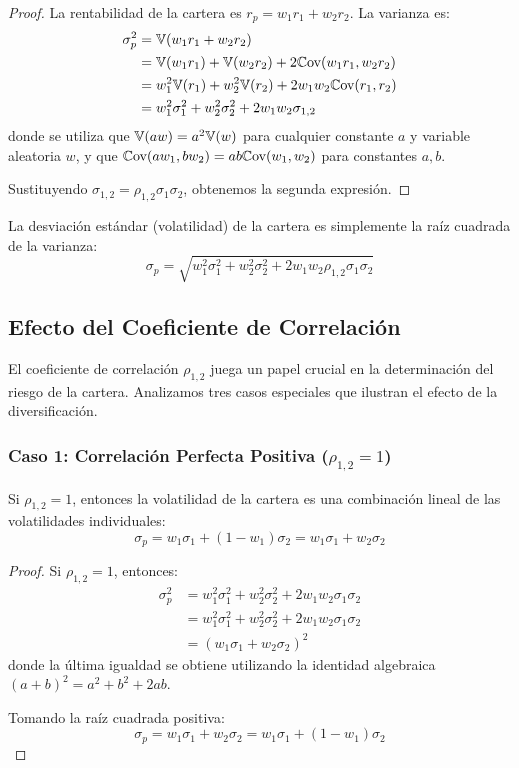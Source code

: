 \begin{proof}
La rentabilidad de la cartera es $r_p = w_1 r_1 + w_2 r_2$. La varianza es:
\begin{align*}
\sigma_p^2 &= \mathbb{V}(w_1 r_1 + w_2 r_2) \\
&= \mathbb{V}(w_1 r_1) + \mathbb{V}(w_2 r_2) + 2\mathbb{C}\text{ov}(w_1 r_1, w_2 r_2) \\
&= w_1^2 \mathbb{V}(r_1) + w_2^2 \mathbb{V}(r_2) + 2w_1 w_2 \mathbb{C}\text{ov}(r_1, r_2) \\
&= w_1^2 \sigma_1^2 + w_2^2 \sigma_2^2 + 2w_1 w_2 \sigma_{1,2}
\end{align*}
donde se utiliza que $\mathbb{V}(aw) = a^2\mathbb{V}(w)$ para cualquier constante $a$ y variable aleatoria $w$, y que $\mathbb{C}\text{ov}(aw_1, bw_2) = ab\mathbb{C}\text{ov}(w_1, w_2)$ para constantes $a, b$.

Sustituyendo $\sigma_{1,2} = \rho_{1,2} \sigma_1 \sigma_2$, obtenemos la segunda expresión.
\end{proof}

La desviación estándar (volatilidad) de la cartera es simplemente la raíz cuadrada de la varianza:
\begin{equation}
\sigma_p = \sqrt{w_1^2 \sigma_1^2 + w_2^2 \sigma_2^2 + 2w_1 w_2 \rho_{1,2} \sigma_1 \sigma_2}
\end{equation}

\subsection{Efecto del Coeficiente de Correlación}

El coeficiente de correlación $\rho_{1,2}$ juega un papel crucial en la determinación del riesgo de la cartera. Analizamos tres casos especiales que ilustran el efecto de la diversificación.

\subsubsection{Caso 1: Correlación Perfecta Positiva ($\rho_{1,2} = 1$)}

\begin{proposicion}
Si $\rho_{1,2} = 1$, entonces la volatilidad de la cartera es una combinación lineal de las volatilidades individuales:
\begin{equation}
\sigma_p = w_1 \sigma_1 + (1 - w_1) \sigma_2 = w_1 \sigma_1 + w_2 \sigma_2
\end{equation}
\end{proposicion}

\begin{proof}
Si $\rho_{1,2} = 1$, entonces:
\begin{align*}
\sigma_p^2 &= w_1^2 \sigma_1^2 + w_2^2 \sigma_2^2 + 2w_1 w_2 \sigma_1 \sigma_2 \\
&= w_1^2 \sigma_1^2 + w_2^2 \sigma_2^2 + 2w_1 w_2 \sigma_1 \sigma_2 \\
&= (w_1 \sigma_1 + w_2 \sigma_2)^2
\end{align*}
donde la última igualdad se obtiene utilizando la identidad algebraica $(a + b)^2 = a^2 + b^2 + 2ab$.

Tomando la raíz cuadrada positiva:
$$\sigma_p = w_1 \sigma_1 + w_2 \sigma_2 = w_1 \sigma_1 + (1 - w_1) \sigma_2$$
\end{proof}

